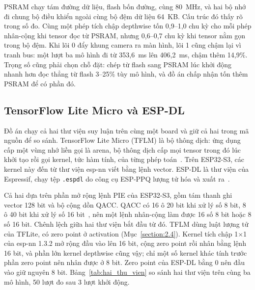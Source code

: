\documentclass[../DoAn.tex]{subfiles}
\begin{document}
PSRAM chạy tám đường dữ liệu, flash bốn đường, cùng 80~MHz, và hai bộ nhớ đi chung
bộ điều khiển ngoài cùng bộ đệm dữ liệu 64~KB. Cấu trúc đó thấy rõ trong số đo.
Cùng một phép tích chập depthwise tốn 0,9--1,0 chu kỳ cho mỗi phép
nhân-cộng khi tensor đọc từ PSRAM, nhưng 0,6--0,7 chu kỳ khi tensor nằm gọn trong
bộ đệm. Khi lõi 0 đẩy khung camera ra màn hình, lõi 1 cũng chậm lại vì tranh bus:
một lượt ba mô hình đi từ 353,6~ms lên 406,2~ms, chậm thêm 14,9\%. Trọng số cũng
phải chọn chỗ đặt: chép từ flash sang PSRAM lúc khởi động nhanh hơn đọc thẳng từ
flash 3--25\% tùy mô hình, và đồ án chấp nhận tốn thêm PSRAM để có phần đó.

\subsection{TensorFlow Lite Micro và ESP-DL}
\label{section:2.2.2}

Đồ án chạy cả hai thư viện suy luận trên cùng một board và giữ cả hai trong mã
nguồn để so sánh. TensorFlow Lite Micro (TFLM) là bộ thông dịch: ứng dụng cấp một
vùng nhớ liền gọi là arena, bộ thông dịch cấp mọi tensor trong đó lúc khởi tạo
rồi gọi kernel, tức hàm tính, của từng phép toán~\cite{david2021}. Trên ESP32-S3,
các kernel này đến từ thư viện esp-nn viết bằng lệnh vector. ESP-DL là thư viện của
Espressif, chạy tệp \texttt{.espdl} do công cụ ESP-PPQ lượng tử hóa và xuất
ra~\cite{espdl,espppq,espdlquant}.

Cả hai dựa trên phần mở rộng lệnh PIE của ESP32-S3, gồm tám thanh ghi vector 128
bit và bộ cộng dồn QACC. QACC có 16 ô 20 bit khi xử lý số 8 bit, 8 ô 40 bit khi
xử lý số 16 bit~\cite{esp32s3trm}, nên một lệnh nhân-cộng làm được 16 số 8 bit
hoặc 8 số 16 bit. Chênh lệch giữa hai thư viện bắt đầu từ đó. TFLM dùng luật
lượng tử của TFLite, có zero point ở activation (Mục~\ref{section:2.4}). Kernel
tích chập 1$\times$1 của esp-nn 1.3.2 mở rộng đầu vào lên 16 bit, cộng zero point
rồi nhân bằng lệnh 16 bit, và phần lớn kernel depthwise cũng vậy; chỉ một số kernel
khác tính trước phần zero point nên nhân được ở 8 bit. Zero point của ESP-DL bằng
0 nên đầu vào giữ nguyên 8 bit. Bảng~\ref{tab:hai_thu_vien} so sánh hai thư viện
trên cùng ba mô hình, 50 lượt đo sau 3 lượt khởi động.
\end{document}

